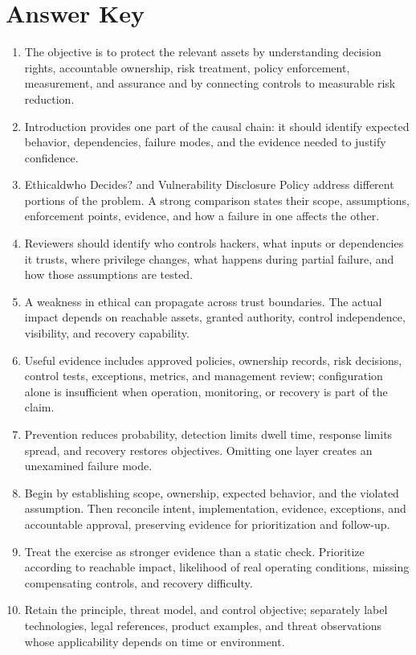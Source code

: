 \documentclass[11pt,letterpaper]{article}
\begin{document}
\section*{Answer Key}
\begin{enumerate}
\item The objective is to protect the relevant assets by understanding decision rights, accountable ownership, risk treatment, policy enforcement, measurement, and assurance and by connecting controls to measurable risk reduction.
\item Introduction provides one part of the causal chain: it should identify expected behavior, dependencies, failure modes, and the evidence needed to justify confidence.
\item Ethicaldwho Decides? and Vulnerability Disclosure Policy address different portions of the problem. A strong comparison states their scope, assumptions, enforcement points, evidence, and how a failure in one affects the other.
\item Reviewers should identify who controls hackers, what inputs or dependencies it trusts, where privilege changes, what happens during partial failure, and how those assumptions are tested.
\item A weakness in ethical can propagate across trust boundaries. The actual impact depends on reachable assets, granted authority, control independence, visibility, and recovery capability.
\item Useful evidence includes approved policies, ownership records, risk decisions, control tests, exceptions, metrics, and management review; configuration alone is insufficient when operation, monitoring, or recovery is part of the claim.
\item Prevention reduces probability, detection limits dwell time, response limits spread, and recovery restores objectives. Omitting one layer creates an unexamined failure mode.
\item Begin by establishing scope, ownership, expected behavior, and the violated assumption. Then reconcile intent, implementation, evidence, exceptions, and accountable approval, preserving evidence for prioritization and follow-up.
\item Treat the exercise as stronger evidence than a static check. Prioritize according to reachable impact, likelihood of real operating conditions, missing compensating controls, and recovery difficulty.
\item Retain the principle, threat model, and control objective; separately label technologies, legal references, product examples, and threat observations whose applicability depends on time or environment.
\end{enumerate}
\end{document}
